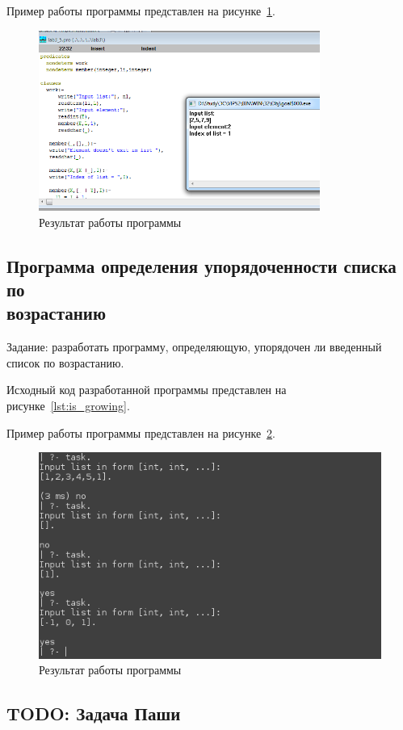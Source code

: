 Пример работы программы представлен на рисунке~\ref{fig:idx_by_el}.

\begin{figure}[h!]
  \centering
  \includegraphics[width=92mm]{img/idx_by_el}
  \caption{Результат работы программы}
  \label{fig:idx_by_el}
\end{figure}


\subsection{Программа определения упорядоченности списка по \\ возрастанию}

Задание: разработать программу, определяющую,
упорядочен ли введенный список по возрастанию.

Исходный код разработанной программы представлен на
рисунке~\ref{lst:is_growing}.



Пример работы программы представлен на рисунке~\ref{fig:is_growing}.

\begin{figure}[h!]
  \centering
  \includegraphics[width=120mm]{img/is_growing}
  \caption{Результат работы программы}
  \label{fig:is_growing}
\end{figure}


\subsection{TODO: Задача Паши}